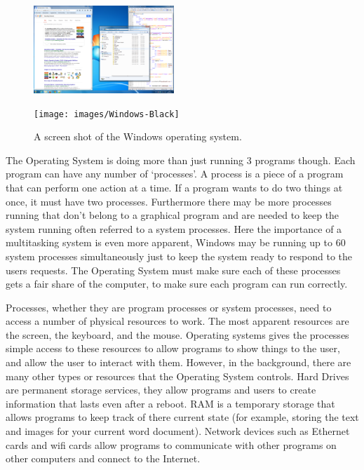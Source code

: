 \documentclass[a4paper]{report}
\begin{document}
\begin{figure}[ht]
\centering
\begin{minipage}{.5\textwidth}
  \centering
  \includegraphics[width=200px]{images/Windows}
  \label{fig:WinProcManScreen}
\end{minipage}%
\begin{minipage}{.5\textwidth}
  \centering
  \texttt{[image: images/Windows-Black]}
  \label{fig:LinProcManScreen}
\end{minipage}
  \caption{A screen shot of the Windows operating system.}
\end{figure}

The Operating System is doing more than just running 3 programs though. Each program can have any number of `processes'. A process is a piece of a program that can perform one action at a time. If a program wants to do two things at once, it must have two processes. Furthermore there may be more processes running that don't belong to a graphical program and are needed to keep the system running often referred to a system processes. Here the importance of a multitasking system is even more apparent, Windows may be running up to 60 system processes simultaneously just to keep the system ready to respond to the users requests. The Operating System must make sure each of these processes gets a fair share of the computer, to make sure each program can run correctly.

Processes, whether they are program processes or system processes, need to access a number of physical resources to work. The most apparent resources are the screen, the keyboard, and the mouse. Operating systems gives the processes simple access to these resources to allow programs to show things to the user, and allow the user to interact with them. However, in the background, there are many other types or resources that the Operating System controls. Hard Drives are permanent storage services, they allow programs and users to create information that lasts even after a reboot. RAM is a temporary storage that allows programs to keep track of there current state (for example, storing the text and images for your current word document). Network devices such as Ethernet cards and wifi cards allow programs to communicate with other programs on other computers and connect to the Internet.
\end{document}

